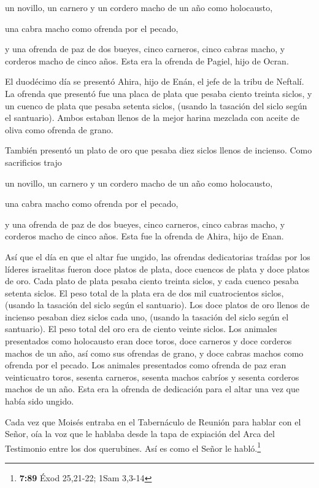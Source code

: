  un novillo, un carnero y un cordero macho de un año como
holocausto,

 una cabra macho como ofrenda por el pecado,

 y una ofrenda de paz de dos bueyes, cinco carneros,
cinco cabras macho, y corderos macho de cinco años. Esta era la ofrenda
de Pagiel, hijo de Ocran.

 El duodécimo día se presentó Ahira, hijo de Enán, el
jefe de la tribu de Neftalí.  La ofrenda que presentó fue
una placa de plata que pesaba ciento treinta siclos, y un cuenco de
plata que pesaba setenta siclos, (usando la tasación del siclo según el
santuario). Ambos estaban llenos de la mejor harina mezclada con aceite
de oliva como ofrenda de grano.

 También presentó un plato de oro que pesaba diez siclos
llenos de incienso. Como sacrificios trajo

 un novillo, un carnero y un cordero macho de un año como
holocausto,

 una cabra macho como ofrenda por el pecado,

 y una ofrenda de paz de dos bueyes, cinco carneros,
cinco cabras macho, y corderos macho de cinco años. Esta fue la ofrenda
de Ahira, hijo de Enan.

 Así que el día en que el altar fue ungido, las ofrendas
dedicatorias traídas por los líderes israelitas fueron doce platos de
plata, doce cuencos de plata y doce platos de oro.  Cada
plato de plata pesaba ciento treinta siclos, y cada cuenco pesaba
setenta siclos. El peso total de la plata era de dos mil cuatrocientos
siclos, (usando la tasación del siclo según el santuario).
 Los doce platos de oro llenos de incienso pesaban diez
siclos cada uno, (usando la tasación del siclo según el santuario). El
peso total del oro era de ciento veinte siclos.  Los
animales presentados como holocausto eran doce toros, doce carneros y
doce corderos machos de un año, así como sus ofrendas de grano, y doce
cabras machos como ofrenda por el pecado.  Los animales
presentados como ofrenda de paz eran veinticuatro toros, sesenta
carneros, sesenta machos cabríos y sesenta corderos machos de un año.
Esta era la ofrenda de dedicación para el altar una vez que había sido
ungido.

 Cada vez que Moisés entraba en el Tabernáculo de Reunión
para hablar con el Señor, oía la voz que le hablaba desde la tapa de
expiación del Arca del Testimonio entre los dos querubines. Así es como
el Señor le habló.\footnote{\textbf{7:89} Éxod 25,21-22; 1Sam 3,3-14}


